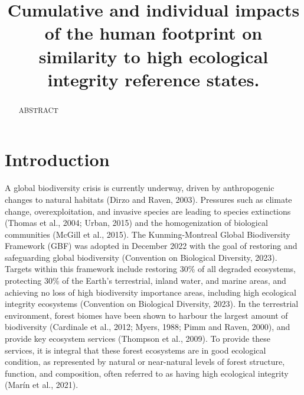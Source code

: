 \documentclass[
]{agujournal2019}
\begin{document}
\title{Cumulative and individual impacts of the human footprint on
similarity to high ecological integrity reference states.}



\begin{abstract}
ABSTRACT
\end{abstract}





\section{Introduction}\label{introduction}

A global biodiversity crisis is currently underway, driven by
anthropogenic changes to natural habitats (Dirzo and Raven, 2003).
Pressures such as climate change, overexploitation, and invasive species
are leading to species extinctions (Thomas et al., 2004; Urban, 2015)
and the homogenization of biological communities (McGill et al., 2015).
The Kunming-Montreal Global Biodiversity Framework (GBF) was adopted in
December 2022 with the goal of restoring and safeguarding global
biodiversity (Convention on Biological Diversity, 2023). Targets within
this framework include restoring 30\% of all degraded ecosystems,
protecting 30\% of the Earth's terrestrial, inland water, and marine
areas, and achieving no loss of high biodiversity importance areas,
including high ecological integrity ecosystems (Convention on Biological
Diversity, 2023). In the terrestrial environment, forest biomes have
been shown to harbour the largest amount of biodiversity (Cardinale et
al., 2012; Myers, 1988; Pimm and Raven, 2000), and provide key ecosystem
services (Thompson et al., 2009). To provide these services, it is
integral that these forest ecosystems are in good ecological condition,
as represented by natural or near-natural levels of forest structure,
function, and composition, often referred to as having high ecological
integrity (Marín et al., 2021).
\end{document}
